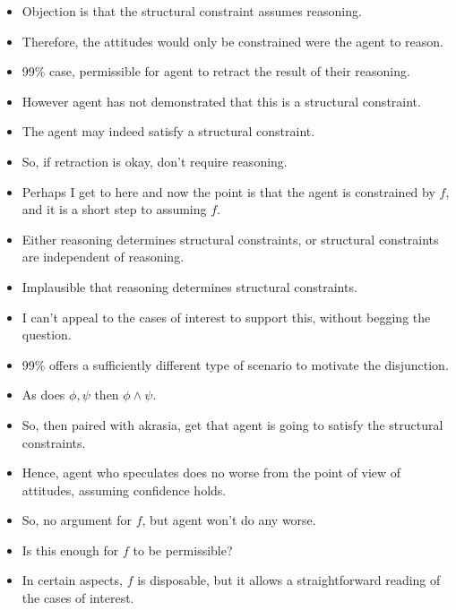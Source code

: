 \documentclass[10pt]{article}
\begin{document}
\begin{itemize}
\item Objection is that the structural constraint assumes reasoning.
\item Therefore, the attitudes would only be constrained were the agent to reason.
\item 99\% case, permissible for agent to retract the result of their reasoning.
\item However agent has not demonstrated that this is a structural constraint.
\item The agent may indeed satisfy a structural constraint.
\item So, if retraction is okay, don't require reasoning.
\end{itemize}

\begin{itemize}
\item Perhaps I get to here and now the point is that the agent is constrained by \(f\), and it is a short step to assuming \(f\).
\end{itemize}

\begin{itemize}
\item Either reasoning determines structural constraints, or structural constraints are independent of reasoning.
\item Implausible that reasoning determines structural constraints.
\item I can't appeal to the cases of interest to support this, without begging the question.
\item 99\% offers a sufficiently different type of scenario to motivate the disjunction.
\item As does \(\phi, \psi\) then \(\phi \land \psi\).
\end{itemize}

\begin{itemize}
\item So, then paired with akrasia, get that agent is going to satisfy the structural constraints.
\item Hence, agent who speculates does no worse from the point of view of attitudes, assuming confidence holds.
\end{itemize}

\begin{itemize}
\item So, no argument for \(f\), but agent won't do any worse.
\item Is this enough for \(f\) to be permissible?
\item In certain aspects, \(f\) is disposable, but it allows a straightforward reading of the cases of interest.
\end{itemize}
\end{document}
